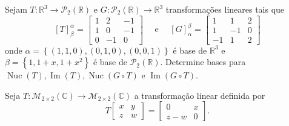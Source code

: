 \begin{questions}
  \begin{solutionordottedlines}
  \end{solutionordottedlines}

  \question\label{exercício:2.16}

  Sejam
  $T\colon\mathbb{R}^{3}\to\mathcal{P}_{2}\left(\mathbb{R}\right)$ e
  $G\colon\mathcal{P}_{2}\left(\mathbb{R}\right)\to\mathbb{R}^{3}$
  transformações lineares tais que
  \[
    {\left[T\right]}_{\beta}^{\alpha}=
    \begin{bmatrix*}
      1 & 2 & -1 \\
      1 & 0 & -1 \\
      0 & -1 & 0
    \end{bmatrix*}\quad
    \text { e }\quad
    {\left[G\right]}_{\alpha}^{\beta}=
    \begin{bmatrix*}
      1 & 1 & 2 \\
      1 & -1 & 0 \\
      -1 & 1 & 2
    \end{bmatrix*}
  \]
  onde
  \begin{math}
    \alpha=
    \left\{
    \left(1,1,0\right),
    \left(0,1,0\right),
    \left(0,0,1\right)
    \right\}
  \end{math}
  é base de $\mathbb{R}^{3}$ e $\beta=\left\{1,1+x,1+x^{2}\right\}$ é
  base de $\mathcal{P}_{2}\left(\mathbb{R}\right)$.
  Determine bases para
  \begin{math}
    \operatorname{Nuc}
    \left(T\right),
    \operatorname{Im}
    \left(T\right),
    \operatorname{Nuc}
    \left(G\circ T\right)
  \end{math}
  e $\operatorname{Im}\left(G\circ T\right)$.

  \begin{solutionordottedlines}
  \end{solutionordottedlines}

  \question\label{exercício:2.17}

  Seja
  \begin{math}
    T\colon
    \mathcal{M}_{2\times2}
    \left(\mathbb{C}\right)\to
    \mathcal{M}_{2\times2}
    \left(\mathbb{C}\right)
  \end{math}
  a transformação linear definida por
  \[
    T
    \begin{bmatrix*}
      x & y \\
      z & w
    \end{bmatrix*}
    =
    \begin{bmatrix*}
      0 & x \\
      z-w & 0
    \end{bmatrix*}.
  \]


\end{questions}
